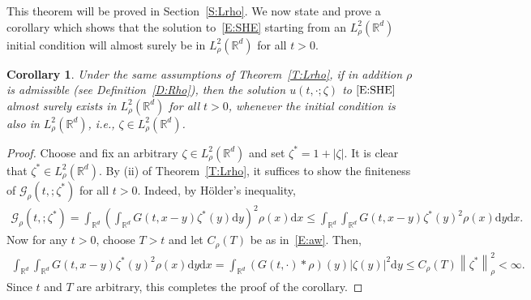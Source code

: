 \documentclass[a4paper,11pt]{article}%
\theoremstyle{plain}
\newtheorem{corollary}[theorem]{Corollary}
\theoremstyle{definition}
\numberwithin{equation}{section}
\newcommand{\R}{\mathbb{R}}
\newcommand{\Norm}[1]{\left\| #1 \right\|}
\newcommand{\ud}{\ensuremath{\mathrm{d}}}
\begin{document}
This theorem will be proved in Section~\ref{S:Lrho}. We now state and prove a corollary which shows
that the solution to~\eqref{E:SHE} starting from an $L^2_{\rho}(\R^d)$ initial condition will almost
surely be in $L^2_{\rho}(\R^d)$ for all $t >0$.

\begin{corollary}\label{C:inclusion}
  Under the same assumptions of Theorem~\ref{T:Lrho}, if in addition $\rho$ is admissible (see
  Definition~\ref{D:Rho}), then the solution $u(t,\cdot;\zeta)$ to $\eqref{E:SHE}$ almost surely
  exists in $L^2_{\rho}(\R^d)$ for all $t>0$, whenever the initial condition is also in
  $L^2_{\rho}(\R^d)$, i.e., $\zeta\in L^2_{\rho}(\R^d)$.
\end{corollary}
\begin{proof}
  Choose and fix an arbitrary $\zeta \in L^2_{\rho}(\R^d)$ and set $\zeta^* = 1+|\zeta|$. It is clear
  that $\zeta^*\in L^2_\rho(\R^d)$. By (ii) of Theorem~\ref{T:Lrho}, it suffices to show the
  finiteness of $\mathcal{G}_{\rho}(t,;\zeta^*)$ for all $t>0$. Indeed, by H\"older's inequality,
  \begin{align*}
        \mathcal{G}_{\rho}(t,;\zeta^*)
     = \int_{\R^d} \left(\int_{\R^d} G(t,x-y) \zeta^* (y) \ud y\right)^2 \rho(x) \ud x
    \le \int_{\R^d} \int_{\R^d} G(t,x-y) \zeta^* (y)^2 \rho(x) \ud y \ud x.
  \end{align*}
  Now for any $t>0$, choose $T>t$ and let $C_{\rho}(T)$ be as in~\eqref{E:aw}. Then,
  \begin{align*}
      \int_{\R^d} \int_{\R^d} G(t,x-y) \zeta^* (y)^2 \rho(x) \ud y \ud x
    = \int_{\R^d} \left(G(t,\cdot)*\rho\right)(y) |\zeta(y)|^2 \ud y
    \le C_{\rho}(T) \Norm{\zeta^*}_{\rho}^2 < \infty.
  \end{align*}
  Since $t$ and $T$ are arbitrary, this completes the proof of the corollary.
\end{proof}
\end{document}
